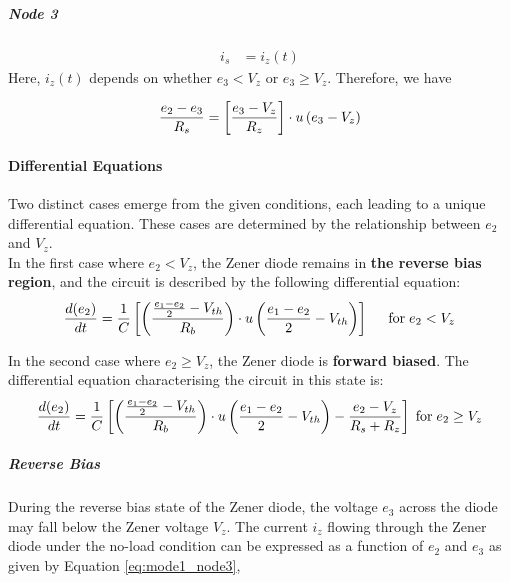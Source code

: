 \subparagraph{Node \textcircled{3}}
\begin{equation}
    \begin{split}
        i_s &= i_z(t)
    \end{split}
\end{equation}
Here, \(i_z(t)\) depends on whether \(e_3 < V_z\) or \(e_3 \geq V_z\). Therefore, we have

\begin{equation}
    \frac{e_2 - e_3}{R_s} = \left[\frac{e_3 - V_z}{R_z} \right]\cdot u\left(e_3 - V_z \right)
    \label{eq:mode1_node3}
\end{equation}

\paragraph{Differential Equations}
Two distinct cases emerge from the given conditions, each leading to a unique differential equation. These cases are determined by the relationship between \(e_2\) and \(V_z\).\\

In the first case where \(e_2 < V_z\), the Zener diode remains in \textbf{the reverse bias region}, and the circuit is described by the following differential equation:
\begin{equation}
    \frac{d(e_2)}{dt}=\frac{1}{C} \left[\left(\frac{\frac{e_1 - e_2}{2} - V_{th}}{R_b} \right) \cdot u\left(\frac{e_1-e_2}{2}-V_{th} \right) \right] \hspace{0.5cm} \text{for} \hspace{0.1cm} e_2 < V_z
\end{equation}

In the second case where \(e_2 \geq V_z\), the Zener diode is \textbf{forward biased}. The differential equation characterising the circuit in this state is:
\begin{equation}
   \frac{d(e_2)}{dt}=\frac{1}{C}\left[\left(\frac{\frac{e_1 - e_2}{2} - V_{th}}{R_b} \right)\cdot u\left(\frac{e_1 - e_2}{2} - V_{th} \right)-\frac{e_2-V_z}{R_s+R_z} \right] \hspace{0.1cm} \text{for} \hspace{0.1cm} e_2 \geq V_z
\end{equation}

\subparagraph{Reverse Bias}
During the reverse bias state of the Zener diode, the voltage $e_3$ across the diode may fall below the Zener voltage $V_z$. The current $i_z$ flowing through the Zener diode under the no-load condition can be expressed as a function of $e_2$ and $e_3$ as given by Equation \ref{eq:mode1_node3},


